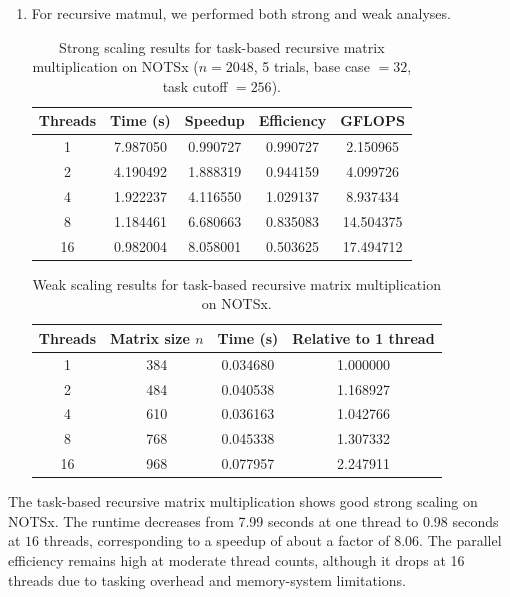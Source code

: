 \documentclass{article}[12pt]
\begin{document}
\begin{enumerate}
For the weak scaling study, the matrix size was chosen according to \(n \approx n_0 p^{1/3}\), so that the total computational work \(O(n^3)\) grows approximately in proportion to the number of threads and the work per thread remains roughly constant. The measured runtimes were 0.0155 s, 0.0193 s, 0.0304 s, 0.0225 s, and 0.0452 s for 1, 2, 4, 8, and 16 threads, respectively. These results indicate non-ideal weak scaling, since the runtime increases overall rather than remaining constant. The loss of weak-scaling efficiency at larger thread counts is likely caused by memory-system effects, cache contention, and parallel runtime overhead.
    \item For recursive matmul, we performed both strong and weak analyses.
    \begin{table}[h!]
\centering
 
\begin{tabular}{|c|c|c|c|c|}
\hline
\textbf{Threads} & \textbf{Time (s)} & \textbf{Speedup} & \textbf{Efficiency} & \textbf{GFLOPS} \\
\hline
1  & 7.987050 & 0.990727 & 0.990727 & 2.150965 \\
2  & 4.190492 & 1.888319 & 0.944159 & 4.099726 \\
4  &1.922237& 4.116550 &1.029137 &8.937434 \\
8  & 1.184461 &6.680663 &0.835083 &14.504375 \\
16&0.982004&8.058001&0.503625&17.494712 \\
\hline
\end{tabular}
\caption{Strong scaling results for task-based recursive matrix multiplication on NOTSx ($n=2048$, 5 trials, base case $=32$, task cutoff $=256$).}
\label{tab:recursive_task_strong}
\end{table}

\begin{table}[h!]
\centering
\begin{tabular}{|c|c|c|c|}
\hline
\textbf{Threads} & \textbf{Matrix size $n$} & \textbf{Time (s)} & \textbf{Relative to 1 thread} \\
\hline
1  & 384  & 0.034680 &1.000000 \\
2  & 484  &0.040538 &1.168927 \\
4  & 610 &0.036163 &1.042766 \\
8  & 768 & 0.045338&1.307332 \\
16 & 968 & 0.077957 &2.247911 \\
\hline
\end{tabular}
\label{tab:recursive_task_weak}
\caption{Weak scaling results for task-based recursive matrix multiplication on NOTSx.}
\end{table}
\end{enumerate}
 The task-based recursive matrix multiplication shows good strong scaling on NOTSx. The runtime decreases from 7.99 seconds at one thread to 0.98 seconds at $16$ threads, corresponding to a speedup of about a factor of 8.06. The parallel efficiency remains high at moderate thread counts, although it drops at 16 threads due to tasking overhead and memory-system limitations.
\end{document}
